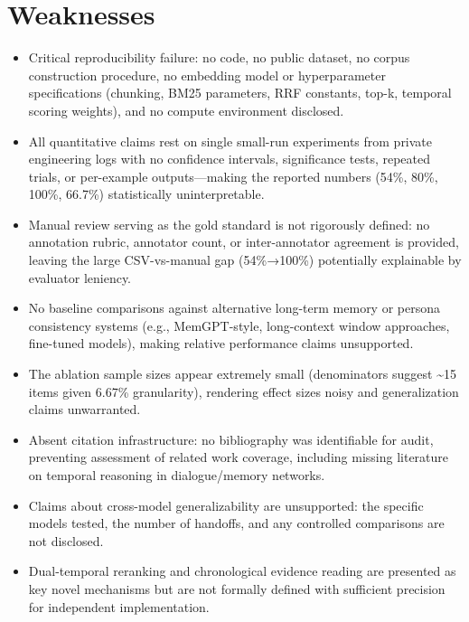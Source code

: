 \documentclass[11pt]{article}
\begin{document}
\section*{Weaknesses}
\begin{itemize}[leftmargin=*]
  \item Critical reproducibility failure: no code, no public dataset, no corpus construction procedure, no embedding model or hyperparameter specifications (chunking, BM25 parameters, RRF constants, top-k, temporal scoring weights), and no compute environment disclosed.
  \item All quantitative claims rest on single small-run experiments from private engineering logs with no confidence intervals, significance tests, repeated trials, or per-example outputs—making the reported numbers (54\%, 80\%, 100\%, 66.7\%) statistically uninterpretable.
  \item Manual review serving as the gold standard is not rigorously defined: no annotation rubric, annotator count, or inter-annotator agreement is provided, leaving the large CSV-vs-manual gap (54\%→100\%) potentially explainable by evaluator leniency.
  \item No baseline comparisons against alternative long-term memory or persona consistency systems (e.g., MemGPT-style, long-context window approaches, fine-tuned models), making relative performance claims unsupported.
  \item The ablation sample sizes appear extremely small (denominators suggest \~{}15 items given 6.67\% granularity), rendering effect sizes noisy and generalization claims unwarranted.
  \item Absent citation infrastructure: no bibliography was identifiable for audit, preventing assessment of related work coverage, including missing literature on temporal reasoning in dialogue/memory networks.
  \item Claims about cross-model generalizability are unsupported: the specific models tested, the number of handoffs, and any controlled comparisons are not disclosed.
  \item Dual-temporal reranking and chronological evidence reading are presented as key novel mechanisms but are not formally defined with sufficient precision for independent implementation.
\end{itemize}
\end{document}
